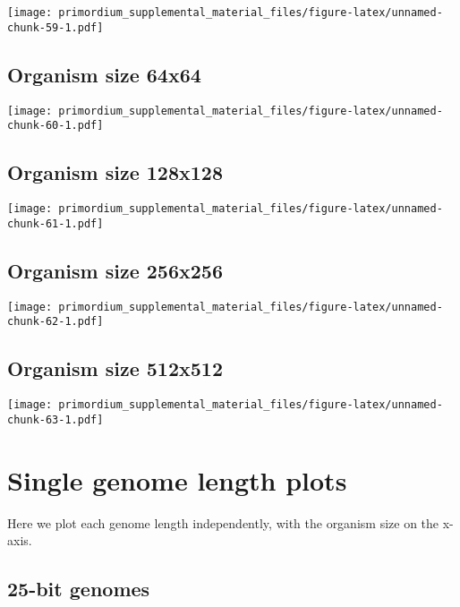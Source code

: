 \documentclass[]{book}
\begin{document}
\texttt{[image: primordium\_supplemental\_material\_files/figure-latex/unnamed-chunk-59-1.pdf]}

\hypertarget{organism-size-64x64-2}{%
\subsection{Organism size 64x64}\label{organism-size-64x64-2}}

\texttt{[image: primordium\_supplemental\_material\_files/figure-latex/unnamed-chunk-60-1.pdf]}

\hypertarget{organism-size-128x128-2}{%
\subsection{Organism size 128x128}\label{organism-size-128x128-2}}

\texttt{[image: primordium\_supplemental\_material\_files/figure-latex/unnamed-chunk-61-1.pdf]}

\hypertarget{organism-size-256x256-2}{%
\subsection{Organism size 256x256}\label{organism-size-256x256-2}}

\texttt{[image: primordium\_supplemental\_material\_files/figure-latex/unnamed-chunk-62-1.pdf]}

\hypertarget{organism-size-512x512-2}{%
\subsection{Organism size 512x512}\label{organism-size-512x512-2}}

\texttt{[image: primordium\_supplemental\_material\_files/figure-latex/unnamed-chunk-63-1.pdf]}

\hypertarget{single-genome-length-plots}{%
\section{Single genome length plots}\label{single-genome-length-plots}}

Here we plot each genome length independently, with the organism size on the x-axis.

\hypertarget{bit-genomes}{%
\subsection{25-bit genomes}\label{bit-genomes}}
\end{document}
